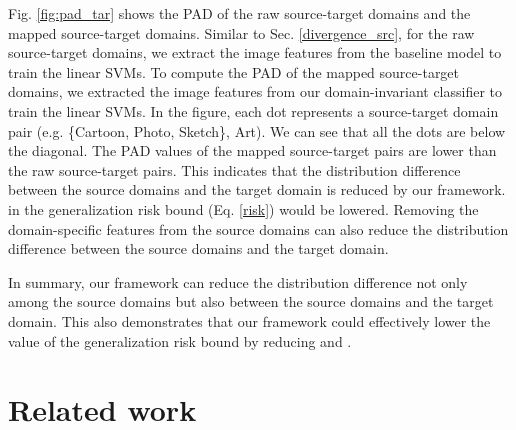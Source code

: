 \documentclass{article}
\begin{document}
Fig. \ref{fig:pad_tar} shows the PAD of the raw source-target domains and the mapped source-target domains. Similar to Sec. \ref{divergence_src}, for the raw source-target domains, we extract the image features from the baseline model to train the linear SVMs. To compute the PAD of the mapped source-target domains, we extracted the image features from our domain-invariant classifier to train the linear SVMs. In the figure, each dot represents a source-target domain pair (e.g. \{Cartoon, Photo, Sketch\}, Art). We can see that all the dots are below the diagonal. The PAD values of the mapped source-target pairs are lower than the raw source-target pairs. This indicates that the distribution difference between the source domains and the target domain is reduced by our framework.  in the generalization risk bound (Eq. \ref{risk}) would be lowered. Removing the domain-specific features from the source domains can also reduce the distribution difference between the source domains and the target domain. 

In summary, our framework can reduce the distribution difference not only among the source domains but also between the source domains and the target domain. This also demonstrates that our framework could effectively lower the value of the generalization risk bound by reducing  and .

\section{Related work}
\end{document}
